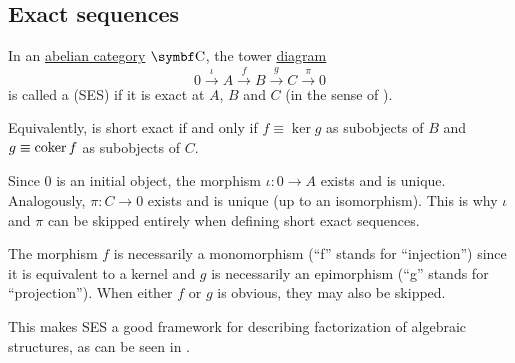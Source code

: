 \subsection{Exact sequences}\label{subsec:exact_sequences}

\begin{Definition}\label{def:short_exact_sequence}\cite[196]{MacLane1994}
  In an \hyperref[def:abelian_category]{abelian category} \( \Cat{C} \), the tower \hyperref[def:tower_diagram]{diagram}
  \begin{equation}\label{def:short_exact_sequence/diagram}
    0
    \overset \iota \longrightarrow
    A
    \overset f \longrightarrow
    B
    \overset g \longrightarrow
    C
    \overset \pi \longrightarrow
    0
  \end{equation}
  is called a  (SES) if it is exact at \( A \), \( B \) and \( C \) (in the sense of ).

  Equivalently,  is short exact if and only if \( f \equiv \ker g \) as subobjects of \( B \) and \( g \equiv \operatorname{co}\!\ker f \) as subobjects of \( C \).
\end{Definition}

\begin{Remark}\label{remark:short_exact_sequence_factorization}
  Since \( 0 \) is an initial object, the morphism \( \iota: 0 \to A \) exists and is unique. Analogously, \( \pi: C \to 0 \) exists and is unique (up to an isomorphism). This is why \( \iota \) and \( \pi \) can be skipped entirely when defining short exact sequences.

  The morphism \( f \) is necessarily a monomorphism (\enquote{f} stands for \enquote{injection}) since it is equivalent to a kernel and \( g \) is necessarily an epimorphism (\enquote{g} stands for \enquote{projection}). When either \( f \) or \( g \) is obvious, they may also be skipped.

  This makes SES a good framework for describing factorization of algebraic structures, as can be seen in .
\end{Remark}

